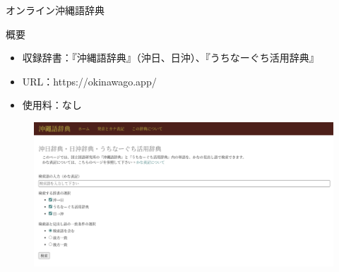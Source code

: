 \documentclass[14pt]{beamer}
\begin{document}
\begin{frame}{オンライン沖縄語辞典}
  \begin{block}{概要}
    \begin{itemize}
    \item  収録辞書：『沖縄語辞典』（沖日、日沖）、『うちなーぐち活用辞典』
    \item  URL：https://okinawago.app/
    \item 使用料：なし
    \end{itemize}
    \begin{figure}[ht]
      \centering
      \includegraphics[height=0.35\paperheight,width=0.5\paperwidth]{okinawago-app-top-page.png}
    \end{figure}
  \end{block}
\end{frame}
\end{document}

